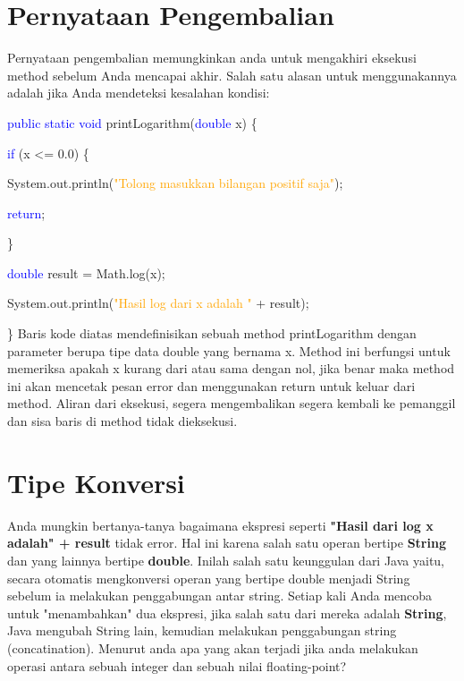 \section{Pernyataan Pengembalian}
Pernyataan pengembalian memungkinkan anda untuk mengakhiri eksekusi method sebelum Anda mencapai akhir. Salah satu alasan untuk menggunakannya adalah jika Anda mendeteksi kesalahan kondisi:
\newline
\par
\textcolor{blue}{public static void} printLogarithm(\textcolor{blue}{double} x) \{
\par
\textcolor{blue}{if} (x \textless= 0.0) \{
\par
System.out.println(\textcolor{orange}{"Tolong masukkan bilangan positif saja"});
\par
\textcolor{blue}{return};
\par
\}
\par
\textcolor{blue}{double} result = Math.log(x);
\par
System.out.println(\textcolor{orange}{"Hasil log dari x adalah "} + result);
\par
\}
\newline
\newline
Baris kode diatas mendefinisikan sebuah method printLogarithm dengan parameter berupa tipe data double yang bernama x. Method ini berfungsi untuk memeriksa apakah x kurang dari atau sama dengan nol, jika benar maka method ini akan mencetak pesan error dan menggunakan return untuk keluar dari method. Aliran dari eksekusi, segera mengembalikan segera kembali ke pemanggil dan sisa baris di method tidak dieksekusi.

\section{Tipe Konversi}
Anda mungkin bertanya-tanya bagaimana ekspresi seperti \textbf{"Hasil dari log x adalah" + result} tidak error. Hal ini karena salah satu operan bertipe \textbf{String} dan yang lainnya bertipe \textbf{double}. Inilah salah satu keunggulan dari Java yaitu, secara otomatis mengkonversi operan yang bertipe double menjadi String sebelum ia melakukan penggabungan antar string. 
\newline
Setiap kali Anda mencoba untuk "menambahkan" dua ekspresi, jika salah satu dari mereka adalah \textbf{String}, Java mengubah String lain, kemudian melakukan penggabungan string (concatination). Menurut anda apa yang akan terjadi jika anda melakukan operasi antara sebuah integer dan sebuah nilai floating-point?

